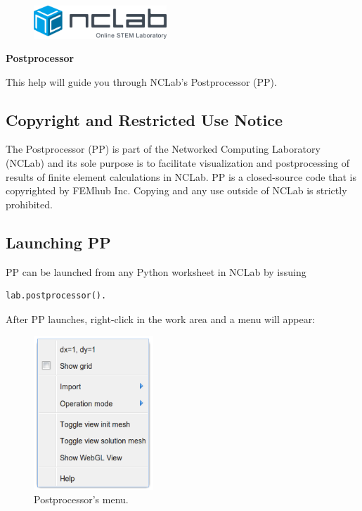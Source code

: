 \documentclass{article}
\begin{document}
\large

\vbox{}
\begin{figure}[!ht]
\includegraphics[width=5cm]{logo.png}
\vspace{4mm}
\end{figure}

\centerline{\huge \bf Postprocessor}
\vspace{6mm}
\noindent
This help will guide you through NCLab's Postprocessor (PP).

\subsection*{Copyright and Restricted Use Notice}

The Postprocessor (PP) is part of the Networked Computing Laboratory (NCLab) and its sole 
purpose is to facilitate visualization and postprocessing of results of finite element 
calculations in NCLab. PP is a closed-source code that is copyrighted by FEMhub Inc. Copying 
and any use outside of NCLab is strictly prohibited.

\subsection*{Launching PP}

PP can be launched from any Python worksheet in NCLab by issuing 

\begin{verbatim}
lab.postprocessor().
\end{verbatim}
After PP launches, right-click in the work area and a menu will appear:\\

\begin{figure}[!ht]
\begin{center}
\includegraphics[width=4.5cm]{pp-menu.png}
\end{center}
\vspace{-4mm}
\caption{Postprocessor's menu.}
\end{figure}
\end{document}
